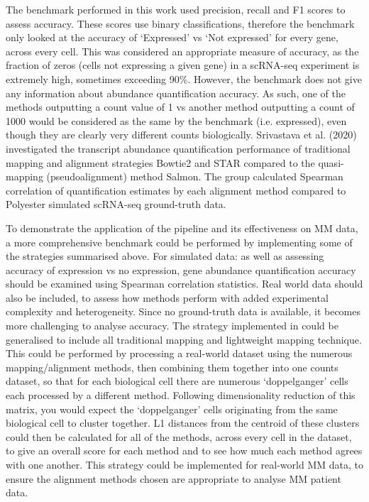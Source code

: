 The benchmark performed in this work used precision, recall and F1 scores to assess accuracy.
These scores use binary classifications, therefore the benchmark only looked at the accuracy of `Expressed' vs `Not expressed' for every gene, across every cell.
This was considered an appropriate measure of accuracy, as the fraction of zeros (cells not expressing a given gene) in a scRNA-seq experiment is extremely high, sometimes exceeding 90\%\cite{linderman2022zero}.
However, the benchmark does not give any information about abundance quantification accuracy.
As such, one of the methods outputting a count value of 1 vs another method outputting a count of 1000 would be considered as the same by the benchmark (i.e. expressed), even though they are clearly very different counts biologically.
Srivastava et al. (2020) investigated the transcript abundance quantification performance of traditional mapping and alignment strategies Bowtie2 and STAR compared to the quasi-mapping (pseudoalignment) method Salmon\cite{srivastava2020alignment}.
The group calculated Spearman correlation of quantification estimates by each alignment method compared to Polyester simulated scRNA-seq ground-truth data.

To demonstrate the application of the pipeline and its effectiveness on MM data, a more comprehensive benchmark could be performed by implementing some of the strategies summarised above.
For simulated data: as well as assessing accuracy of expression vs no expression, gene abundance quantification accuracy should be examined using Spearman correlation statistics.
Real world data should also be included, to assess how methods perform with added experimental complexity and heterogeneity.
Since no ground-truth data is available, it becomes more challenging to analyse accuracy.
The strategy implemented in \cite{booeshaghi2021benchmarking} could be generalised to include all traditional mapping and lightweight mapping technique.
This could be performed by processing a real-world dataset using the numerous mapping/alignment methods, then combining them together into one counts dataset, so that for each biological cell there are numerous `doppelganger' cells each processed by a different method.
Following dimensionality reduction of this matrix, you would expect the `doppelganger' cells originating from the same biological cell to cluster together.
L1 distances from the centroid of these clusters could then be calculated for all of the methods, across every cell in the dataset, to give an overall score for each method and to see how much each method agrees with one another.
This strategy could be implemented for real-world MM data, to ensure the alignment methods chosen are appropriate to analyse MM patient data.

